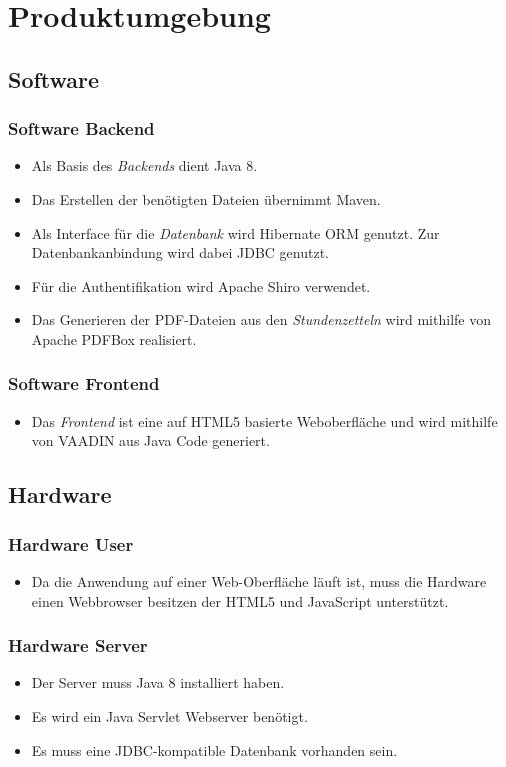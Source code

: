 \section{Produktumgebung}

\subsection{Software}
\subsubsection{Software Backend}
\begin{itemize}
    \item Als Basis des \emph{Backends} dient Java 8.
    \item Das Erstellen der benötigten Dateien übernimmt Maven.
    \item Als Interface für die \emph{Datenbank} wird Hibernate ORM genutzt.
            Zur Datenbankanbindung wird dabei JDBC genutzt.
    \item Für die Authentifikation wird Apache Shiro verwendet.
    \item Das Generieren der PDF-Dateien aus den \emph{Stundenzetteln} wird mithilfe von Apache PDFBox realisiert.
\end{itemize}

\subsubsection{Software Frontend}
\begin{itemize}
    \item Das \emph{Frontend} ist eine auf HTML5 basierte Weboberfläche und wird mithilfe von VAADIN aus Java Code generiert.
\end{itemize}

\subsection{Hardware}
\subsubsection{Hardware User}
\begin{itemize}
    \item Da die Anwendung auf einer Web-Oberfläche läuft ist, muss die Hardware einen Webbrowser besitzen der HTML5 und JavaScript unterstützt.
\end{itemize}

\subsubsection{Hardware Server}
\begin{itemize}
    \item Der Server muss Java 8 installiert haben.
    \item Es wird ein Java Servlet Webserver benötigt.
    \item Es muss eine JDBC-kompatible Datenbank vorhanden sein.
\end{itemize}
